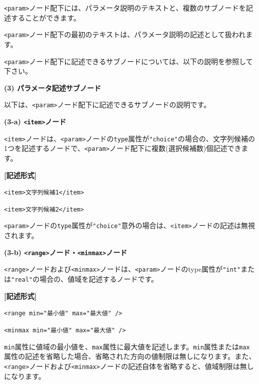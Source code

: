 \documentclass[a4paper,11pt]{jarticle}
\begin{document}
{\vspace{12pt}
\texttt{<param>}ノード配下には、パラメータ説明のテキストと、複数のサブノードを記述することができます。

\texttt{<param>}ノード配下の最初のテキストは、パラメータ説明の記述として扱われます。

\texttt{<param>}ノード配下に記述できるサブノードについては、以下の説明を参照して下さい。

\vspace{12pt}
\textbf{(3) パラメータ記述サブノード}

以下は、\texttt{<param>}ノード配下に記述できるサブノードの説明です。

\vspace{12pt}
\textbf{(3-a) \texttt{<item>}ノード }

\parindent=3pt
\texttt{<item>}ノードは、\texttt{<param>}ノードの{\tt type}属性が\texttt{"choice"}の場合の、文字列候補の1つを記述するノードで、\texttt{<param>}ノード配下に複数(選択候補数)個記述できます。

\vspace{8pt}
\parindent=0pt
\leftskip=12pt
\textbf{[記述形式]}

\leftskip=42pt
\texttt{<item>文字列候補1</item>}

\texttt{<item>文字列候補2</item>}

\vspace{8pt}
\leftskip=0pt
\texttt{<param>}ノードの{\tt type}属性が\texttt{"choice"}意外の場合は、\texttt{<item>}ノードの記述は無視されます。

\vspace{12pt}
\textbf{(3-b) \texttt{<range>}ノード・\texttt{<minmax>}ノード}

\texttt{<range>}ノードおよび\texttt{<minmax>}ノードは、\texttt{<param>}ノードのtype属性が\texttt{"int"}または\texttt{"real"}の場合の、値域を記述するノードです。

\vspace{8pt}
\leftskip=12pt
\textbf{[記述形式]}

\leftskip=42pt
\texttt{<range  min="最小値"  max="最大値" />}

\texttt{<minmax  min="最小値"  max="最大値" />}

\vspace{8pt}
\leftskip=0pt
{\tt min}属性に値域の最小値を、{\tt max}属性に最大値を記述します。{\tt min}属性または{\tt max}属性の記述を省略した場合、省略された方向の値制限は無しになります。また、\texttt{<range>}ノードおよび\texttt{<minmax>}ノードの記述自体を省略すると、値域制限は無しになります。

}
\end{document}
